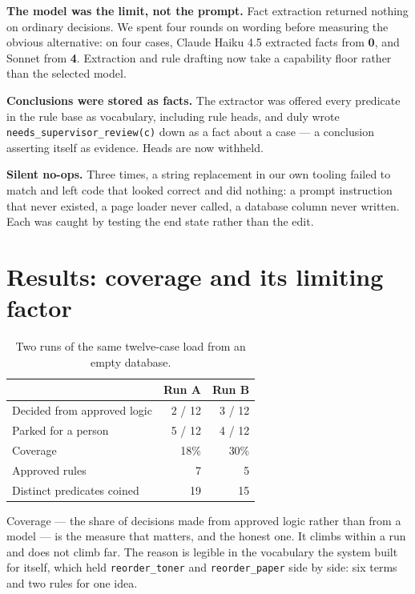 \documentclass[sigconf,nonacm]{acmart}
\begin{document}
\textbf{The model was the limit, not the prompt.} Fact extraction returned
nothing on ordinary decisions. We spent four rounds on wording before measuring
the obvious alternative: on four cases, Claude Haiku 4.5 extracted facts from
\textbf{0}, and Sonnet from \textbf{4}. Extraction and rule drafting now take a
capability floor rather than the selected model.

\textbf{Conclusions were stored as facts.} The extractor was offered every
predicate in the rule base as vocabulary, including rule heads, and duly wrote
\texttt{needs\_supervisor\_review(c)} down as a fact about a case --- a
conclusion asserting itself as evidence. Heads are now withheld.

\textbf{Silent no-ops.} Three times, a string replacement in our own tooling
failed to match and left code that looked correct and did nothing: a prompt
instruction that never existed, a page loader never called, a database column
never written. Each was caught by testing the end state rather than the edit.

\section{Results: coverage and its limiting factor}

\begin{table}[t]
\caption{Two runs of the same twelve-case load from an empty database.}
\label{tab:coverage}
\small
\begin{tabular}{@{}lrr@{}}
\toprule
& \textbf{Run A} & \textbf{Run B} \\
\midrule
Decided from approved logic & 2 / 12 & 3 / 12 \\
Parked for a person         & 5 / 12 & 4 / 12 \\
Coverage                    & 18\%   & 30\%  \\
Approved rules              & 7      & 5     \\
Distinct predicates coined  & 19     & 15    \\
\bottomrule
\end{tabular}
\end{table}

Coverage --- the share of decisions made from approved logic rather than from a
model --- is the measure that matters, and the honest one. It climbs within a
run and does not climb far. The reason is legible in the vocabulary the system
built for itself, which held \texttt{reorder\_toner} and \texttt{reorder\_paper}
side by side: six terms and two rules for one idea.
\end{document}
